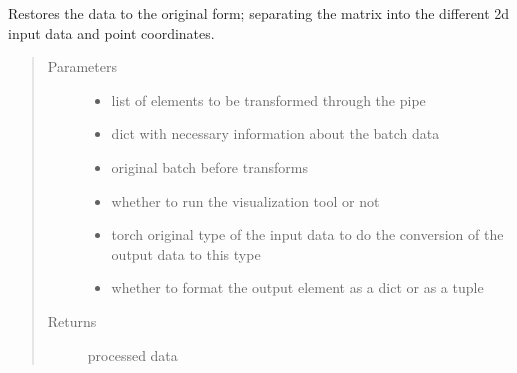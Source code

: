 \documentclass[letterpaper,10pt,english]{sphinxmanual}
\begin{document}
\begin{fulllineitems}
\label{\detokenize{ida_lib.core:ida_lib.core.pipeline_functional.postprocess_data}}
Restores the data to the original form;
separating the matrix into the different 2d input data and point coordinates.
\begin{quote}\begin{description}
\item[{Parameters}] \leavevmode\begin{itemize}
\item {} 
 \textendash{} list of elements to be transformed through the pipe

\item {} 
 \textendash{} dict with necessary information about the batch data

\item {} 
 \textendash{} original batch before transforms

\item {} 
 \textendash{} whether to run the visualization tool or not

\item {} 
 \textendash{} torch original type of the input data to do the conversion of the output data to this type

\item {} 
 \textendash{} whether to format the output element as a dict or as a tuple

\end{itemize}

\item[{Returns}] \leavevmode
processed data

\end{description}\end{quote}

\end{fulllineitems}
\end{document}

